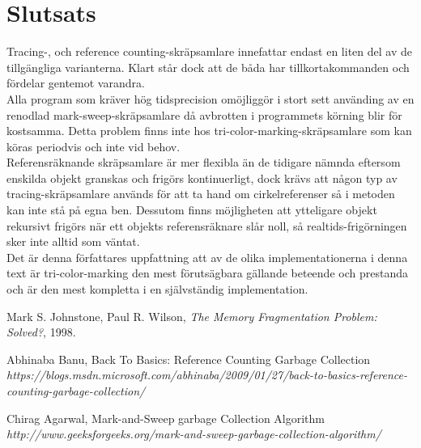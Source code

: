 \documentclass{article}
\begin{document}
\section{Slutsats}
Tracing-, och reference counting-skräpsamlare innefattar endast en liten del av de tillgängliga varianterna. Klart står dock att de båda har tillkortakommanden och fördelar gentemot varandra.\newline
\\
Alla program som kräver hög tidsprecision omöjliggör i stort sett använding av en renodlad mark-sweep-skräpsamlare då avbrotten i programmets körning blir för kostsamma. Detta problem finns inte hos tri-color-marking-skräpsamlare som kan köras periodvis och inte vid behov.\newline
\\
Referensräknande skräpsamlare är mer flexibla än de tidigare nämnda eftersom enskilda objekt granskas och frigörs kontinuerligt, dock krävs att någon typ av tracing-skräpsamlare används för att ta hand om cirkelreferenser så i metoden kan inte stå på egna ben. Dessutom finns möjligheten att ytteligare objekt rekursivt frigörs när ett objekts referensräknare slår noll, så realtids-frigörningen sker inte alltid som väntat.\newline
\\
Det är denna författares uppfattning att av de olika implementationerna i denna text är tri-color-marking den mest förutsägbara gällande beteende och prestanda och är den mest kompletta i en självständig implementation.
\begin{thebibliography}{9}

  Mark S. Johnstone, Paul R. Wilson,
  \textit{The Memory Fragmentation Problem: Solved?},
  1998.
  
  Abhinaba Banu, Back To Basics: Reference Counting Garbage Collection\\
\textit{https://blogs.msdn.microsoft.com/abhinaba/2009/01/27/back-to-basics-reference-counting-garbage-collection/}

  Chirag Agarwal, Mark-and-Sweep garbage Collection Algorithm\\
  \textit{http://www.geeksforgeeks.org/mark-and-sweep-garbage-collection-algorithm/}
\end{thebibliography}
\end{document}
